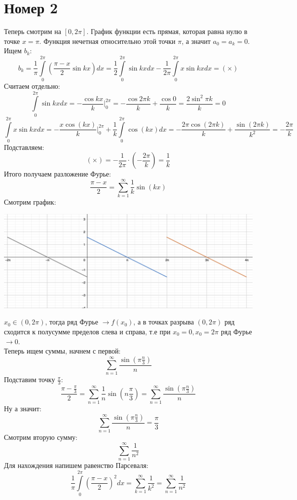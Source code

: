 \documentclass[a4paper,12pt]{article}
\begin{document}
\section*{Номер 2}
Теперь смотрим на $[0, 2\pi]$. График функции есть прямая, которая равна нулю в точке $x = \pi$. Функция нечетная относительно этой точки $\pi$, а значит $a_0 = a_k = 0$. Ищем $b_k$:
\[
b_k = \frac{1}{\pi} \int\limits_0^{2\pi} \left( \frac{\pi - x}{2} \sin kx \right) dx  = \frac{1}{2} \int\limits_0^{2\pi} \sin kx dx - \frac{1}{2\pi} \int\limits_0^{2\pi} x \sin kx dx = (\times)
\]
Считаем отдельно:
\[
\int\limits_0^{2\pi} \sin kx dx = -\frac{\cos kx}{k} \Bigg|_0^{2\pi} = - \frac{\cos 2 \pi k}{k} + \frac{\cos 0}{k} = \frac{2\sin^2 \pi k}{k} = 0
\]
\[
\int\limits_0^{2\pi} x \sin kx dx  = - \frac{x \cos (kx)}{k} \Bigg|_0^{2\pi} + \frac{1}{k} \int\limits_0^{2\pi} \cos(kx) dx  = - \frac{2\pi \cos (2\pi k)}{k} + \frac{\sin (2 \pi k)}{k^2} = - \frac{2\pi}{k}
\]
Подставляем:
\[
(\times) =  - \frac{1}{2\pi} \cdot \left(- \frac{2\pi}{k} \right) =\frac{1}{k}
\]
Итого получаем разложение Фурье:
\[
\frac{\pi - x}{2}  = \sum_{k = 1}^{\infty} \frac{1}{k} \sin (kx) 
\]
Смотрим график:
\begin{center}
\includegraphics[scale=0.3]{2.png}
\end{center}
$x_0 \in(0, 2\pi)$, тогда ряд Фурье $\longrightarrow f(x_0)$, а в точках разрыва $(0, 2\pi)$ ряд сходится к полусумме пределов слева и справа, т.е при $x_0 = 0, x_0 = 2\pi$ ряд Фурье $\longrightarrow 0$.
\\
Теперь ищем суммы, начнем с первой:
\[
\sum_{n = 1}^{\infty} \frac{\sin \left(\pi \frac{n}{3}\right)}{n}
\]
Подставим точку $\frac{\pi}{3}$:
\[
\frac{\pi - \frac{\pi}{3}}{2} = \sum_{n = 1}^{\infty} \frac{1}{n} \sin \left(n\frac{\pi}{3}\right)  = \sum_{n = 1}^{\infty} \frac{\sin \left(\pi \frac{n}{3}\right)}{n}
\]
Ну а значит:
\[
\sum_{n = 1}^{\infty} \frac{\sin \left(\pi \frac{n}{3}\right)}{n} = \frac{\pi}{3}
\]
Смотрим вторую сумму:
\[
\sum_{n = 1}^{\infty} \frac{1}{n^2}
\]
Для нахождения напишем равенство Парсеваля:
\[
\frac{1}{\pi} \int\limits_0^{2\pi}\left( \frac{\pi - x}{2}\right)^2 dx= \sum_{k = 1}^{\infty} \frac{1}{k^2}   = \sum_{n = 1}^{\infty} \frac{1}{n^2}
\]
\end{document}
